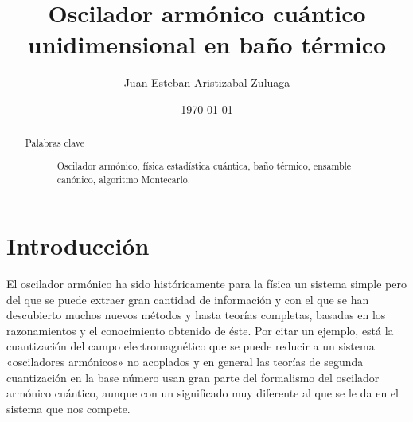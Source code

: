 \documentclass[%
 reprint,
 amsmath,amssymb,
 aps,
 pra,
]{revtex4-2}
\begin{document}

\title{Oscilador armónico cuántico unidimensional en baño térmico}%

\author{Juan Esteban Aristizabal Zuluaga}

\date{\today}%

\begin{abstract}

\begin{description}
\item[Palabras clave] Oscilador armónico, física estadística cuántica, baño térmico, ensamble canónico, algoritmo Montecarlo.
\end{description}
\end{abstract}

\maketitle


\section{\label{sec:Intro}Introducción}
El oscilador armónico ha sido históricamente para la física un sistema simple pero del que se puede extraer gran cantidad de información y con el que se han descubierto muchos nuevos métodos y hasta teorías completas, basadas en los razonamientos y el conocimiento obtenido de éste. Por citar un ejemplo, está la cuantización del campo electromagnético que se puede reducir a un sistema «osciladores armónicos» no acoplados y en general las teorías de segunda cuantización en la base número usan gran parte del formalismo del oscilador armónico cuántico, aunque con un significado muy diferente al que se le da en el sistema que nos compete\cite{Grynberg2010,Schwartz2013}. 
\end{document}
